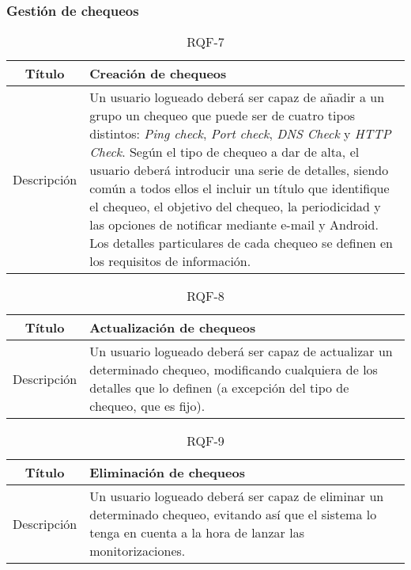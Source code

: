 \FloatBarrier
\subsubsection{Gestión de chequeos}

\begin{table}[h!]
  \centering
  \begin{tabularx}{\textwidth}{|c|X|}
    \hline
    Título & Creación de chequeos \\

    \hline

    Descripción & Un usuario logueado deberá ser capaz de añadir a un grupo un
    chequeo que puede ser de cuatro tipos distintos: \textit{Ping check},
    \textit{Port check}, \textit{DNS Check} y \textit{HTTP Check}. Según el tipo
    de chequeo a dar de alta, el usuario deberá introducir una serie de
    detalles, siendo común a todos ellos el incluir un título que identifique el
    chequeo, el objetivo del chequeo, la periodicidad y las opciones de
    notificar mediante e-mail y Android.  Los detalles particulares de cada
    chequeo se definen en los
    requisitos de información. \\

    \hline
  \end{tabularx}
  \caption{RQF-7}
\end{table}


\begin{table}[h!]
  \centering
  \begin{tabularx}{\textwidth}{|c|X|}
    \hline
    Título & Actualización de chequeos \\

    \hline

    Descripción & Un usuario logueado deberá ser capaz de actualizar un
    determinado chequeo, modificando cualquiera de los detalles que lo definen
    (a excepción del tipo de chequeo, que es fijo). \\

    \hline
  \end{tabularx}
  \caption{RQF-8}
\end{table}

\begin{table}[h!]
  \centering
  \begin{tabularx}{\textwidth}{|c|X|}
    \hline
    Título & Eliminación de chequeos \\

    \hline

    Descripción & Un usuario logueado deberá ser capaz de eliminar un
    determinado chequeo, evitando así que el sistema lo tenga en cuenta a la
    hora de lanzar las monitorizaciones. \\

    \hline
  \end{tabularx}
  \caption{RQF-9}
\end{table}

